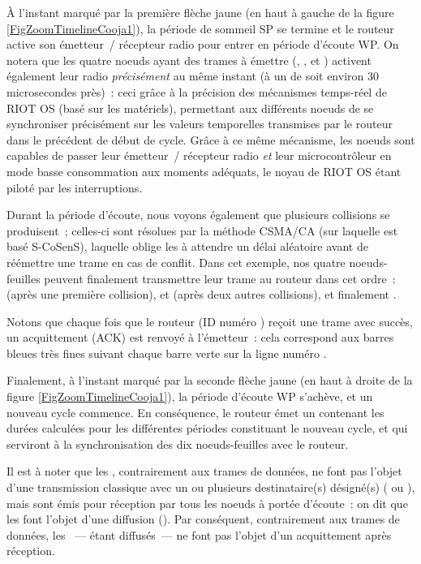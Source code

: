 À l'instant marqué par la première flèche jaune (en haut à gauche de la
figure \vref{FigZoomTimelineCooja1}), la période de sommeil SP se
termine et le routeur active son émetteur~/ récepteur radio pour entrer
en période d'écoute WP. On notera que les quatre noeuds ayant des trames
à émettre (, ,  et ) activent
également leur radio \emph{précisément} au même instant (à un 
de  soit environ 30 microsecondes près)~: ceci grâce à la
précision des mécanismes temps-réel de RIOT OS (basé sur les 
matériels), permettant aux différents noeuds de se synchroniser précisément
sur les valeurs temporelles transmises par le routeur dans le précédent
 de début de cycle. Grâce à ce même mécanisme, les noeuds
sont capables de passer leur émetteur~/ récepteur radio \emph{et} leur
microcontrôleur en mode basse consommation aux moments adéquats,
le noyau de RIOT OS étant piloté par les interruptions.

Durant la période d'écoute, nous voyons également que plusieurs collisions
se produisent~; celles-ci sont résolues par la méthode CSMA/CA (sur laquelle
est basé S-CoSenS), laquelle oblige les  à attendre un délai
aléatoire avant de réémettre une trame en cas de conflit. Dans cet exemple,
nos quatre noeuds-feuilles peuvent finalement transmettre leur trame au
routeur dans cet ordre~:  (après une première collision),
 et  (après deux autres collisions), et finalement
.

Notons que chaque fois que le routeur (ID numéro ) reçoit une
trame avec succès, un acquittement (ACK) est renvoyé à l'émetteur~: cela
correspond aux barres bleues très fines suivant chaque barre verte sur
la ligne numéro .

Finalement, à l'instant marqué par la seconde flèche jaune (en haut à droite
de la figure \vref{FigZoomTimelineCooja1}), la période d'écoute WP
s'achève, et un nouveau cycle commence. En conséquence, le routeur émet un
 contenant les durées calculées pour les différentes
périodes constituant le nouveau cycle, et qui serviront à la synchronisation
des dix noeuds-feuilles avec le routeur.

Il est à noter que les , contrairement aux trames
de données, ne font pas l'objet d'une transmission classique avec un ou
plusieurs destinataire(s) désigné(s) ( ou
), mais sont émis pour réception par tous les noeuds
à portée d'écoute~: on dit que les  font l'objet d'une
diffusion (). Par conséquent, contrairement aux trames
de données, les ~--- étant diffusés~--- ne font pas l'objet
d'un acquittement après réception.

